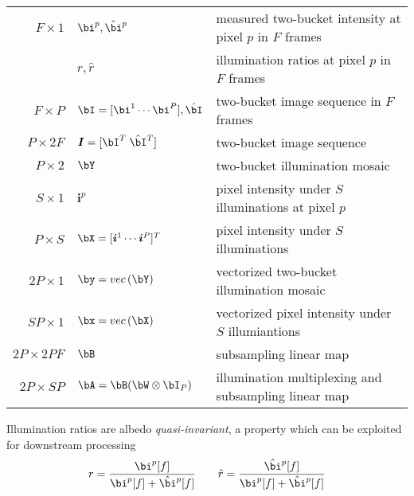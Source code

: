 \documentclass[11pt]{article}
\renewcommand{\vec}[1]{vec\left(#1\right)}
\renewcommand{\si}{\boldsymbol{i}}
\renewcommand{\sI}{\boldsymbol{I}}
\begin{document}
\begin{table}[!htbp]
\begin{center}
\begin{tabular}{rll}
        $F \times 1$         & $\bi^p,\hat{\bi}^p$                     & measured two-bucket intensity at pixel $p$ in $F$ frames \\
                             & $r,\hat{r}$                             & illumination ratios at pixel $p$ in $F$ frames \\
        $F\times P$          & $\bI = [\bi^1 \cdots \bi^P],\hat{\bI}$  & two-bucket image sequence in $F$ frames \\ 
        $P\times 2F$         & $\sI = [\bI^T \;\hat{\bI}^T]$           & two-bucket image sequence \\
        $P\times 2$          & $\bY$                                   & two-bucket illumination mosaic \\
        $S\times 1$          & $\si^p$                                 & pixel intensity under $S$ illuminations at pixel $p$ \\
        $P\times S$          & $\bX = [\si^1 \cdots \si^P]^T$          & pixel intensity under $S$ illuminations \\    
        $2P\times 1$         & $\by = \vec{\bY}$                       & vectorized two-bucket illumination mosaic \\
        $SP\times 1$         & $\bx = \vec{\bX}$                       & vectorized pixel intensity under $S$ illumiantions \\
        $2P\times 2PF$       & $\bB$                                   & subsampling linear map \\
        $2P\times SP$        & $\bA = \bB(\bW\otimes \bI_P)$           & illumination multiplexing and subsampling linear map \\
    \end{tabular}
    \end{center}
\end{table}
\noindent Illumination ratios are albedo \textit{quasi-invariant}, a property which can be exploited for downstream processing
\[
    r = \frac{\bi^p[f]}{\bi^p[f] + \hat{\bi}^p[f]} 
    \quad\quad
    \hat{r} =   \frac{\hat{\bi}^p[f]}{\bi^p[f] + \hat{\bi}^p[f]} 
\]
\end{document}
